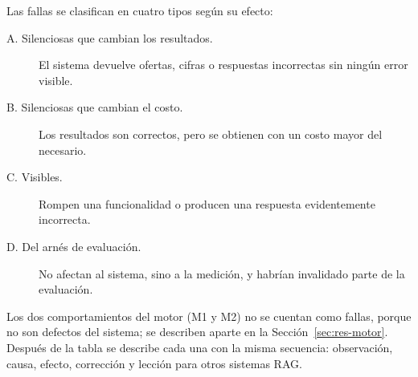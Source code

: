 Las fallas se clasifican en cuatro tipos según su efecto:
\begin{description}
    \item[A. Silenciosas que cambian los resultados.] El sistema devuelve ofertas, cifras o respuestas incorrectas sin ningún error visible.
    \item[B. Silenciosas que cambian el costo.] Los resultados son correctos, pero se obtienen con un costo mayor del necesario.
    \item[C. Visibles.] Rompen una funcionalidad o producen una respuesta evidentemente incorrecta.
    \item[D. Del arnés de evaluación.] No afectan al sistema, sino a la medición, y habrían invalidado parte de la evaluación.
\end{description}
Los dos comportamientos del motor (M1 y M2) no se cuentan como fallas, porque no son defectos del sistema; se describen aparte en la Sección~\ref{sec:res-motor}. Después de la tabla se describe cada una con la misma secuencia: observación, causa, efecto, corrección y lección para otros sistemas RAG.

